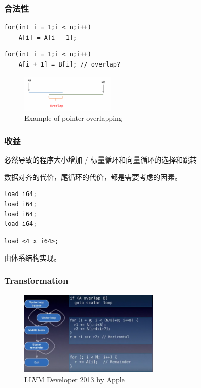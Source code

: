 \documentclass[aspectratio=169]{ctexbeamer}
\begin{document}
\begin{frame}[fragile]
    \frametitle{合法性}

    \begin{lstlisting}
for(int i = 1;i < n;i++)
    A[i] = A[i - 1];
    \end{lstlisting}
    \begin{lstlisting}
for(int i = 1;i < n;i++)
    A[i + 1] = B[i]; // overlap?
    \end{lstlisting}

    \begin{figure}
        \centering
        \includegraphics[width=0.4\textwidth]{images/overlap.png}
        \caption{Example of pointer overlapping}
    \end{figure}

\end{frame}

\begin{frame}[fragile]
    \frametitle{收益}

    必然导致的程序大小增加 / 标量循环和向量循环的选择和跳转

    数据对齐的代价，尾循环的代价，都是需要考虑的因素。

    \begin{minipage}[t]{0.45\linewidth}
        \begin{lstlisting}[language=C++]
load i64;
load i64;
load i64;
load i64;
        \end{lstlisting}
    \end{minipage}
    \begin{minipage}[t]{0.45\linewidth}
        \begin{lstlisting}[language={[RISC-V]Assembler}]
load <4 x i64>;
        \end{lstlisting}
    \end{minipage}

    由体系结构实现。

\end{frame}

\begin{frame}
    \frametitle{Transformation}

    \begin{figure}
        \centering
        \includegraphics[width=0.6\textwidth]{images/trans.png}
        \caption{LLVM Developer 2013 by Apple}
    \end{figure}

\end{frame}
\end{document}
